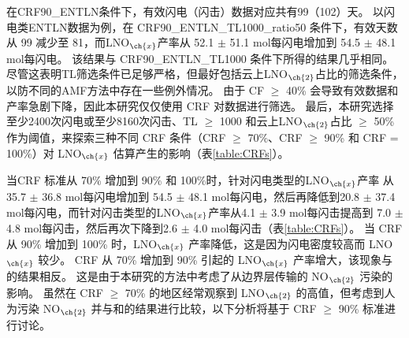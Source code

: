 在CRF90\_ENTLN条件下，有效闪电（闪击）数据对应共有99（102）天。
以闪电类ENTLN数据为例，在 CRF90\_ENTLN\_TL1000\_ratio50 条件下，有效天数从 99 减少至 81，而LNO$_{\ch{x}}$产率从 52.1 $\pm$ 51.1 mol每闪电增加到 54.5 $\pm$ 48.1 mol每闪电。
该结果与 CRF90\_ENTLN\_TL1000 条件下所得的结果几乎相同。
尽管这表明TL筛选条件已足够严格，但最好包括云上LNO$_{\ch{2}}$占比的筛选条件，以防不同的AMF方法中存在一些例外情况。
由于 CF $\geq$ 40\% 会导致有效数据和产率急剧下降，因此本研究仅仅使用 CRF 对数据进行筛选。
最后，本研究选择至少2400次闪电或至少8160次闪击、TL $\geq$ 1000 和云上LNO$_{\ch{2}}$占比 $\geq$ 50\% 作为阈值，来探索三种不同 CRF 条件（CRF $\geq$ 70\%、CRF $\geq$ 90\% 和 CRF = 100\%）对 LNO$_{\ch{x}}$ 估算产生的影响（表\ref{table:CRFs}）。

当CRF 标准从 70\% 增加到 90\% 和 100\%时，针对闪电类型的LNO$_{\ch{x}}$产率 从35.7 $\pm$ 36.8 mol每闪电增加到 54.5 $\pm$ 48.1 mol每闪电，然后再降低到20.8 $\pm$ 37.4 mol每闪电，而针对闪击类型的LNO$_{\ch{x}}$产率从4.1 $\pm$ 3.9 mol每闪击提高到 7.0 $\pm$ 4.8 mol每闪击，然后再次下降到2.6 $\pm$ 4.0 mol每闪击（表\ref{table:CRFs}）。
当 CRF 从 90\% 增加到 100\% 时，LNO$_{\ch{x}}$ 产率降低，这是因为闪电密度较高而 LNO$_{\ch{x}}$ 较少。
CRF 从 70\% 增加到 90\% 引起的 LNO$_{\ch{x}}$ 产率增大，该现象与\citet{Pickering.2016}的结果相反。
这是由于本研究的方法中考虑了从边界层传输的 NO$_{\ch{2}}$ 污染的影响。
虽然在 CRF $\geq$ 70\% 的地区经常观察到 LNO$_{\ch{2}}$ 的高值\citep{Pickering.2016}，但考虑到人为污染 NO$_{\ch{2}}$ 并与\citet{Pickering.2016}和\citet{Lapierre.2020}的结果进行比较，以下分析将基于 CRF $\geq$ 90\% 标准进行讨论。



